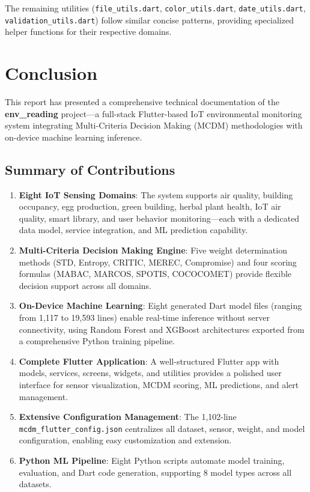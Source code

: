 \documentclass[12pt,a4paper,oneside]{report}
\begin{document}
The remaining utilities (\texttt{file\_utils.dart}, \texttt{color\_utils.dart}, \texttt{date\_utils.dart}, \texttt{validation\_utils.dart}) follow similar concise patterns, providing specialized helper functions for their respective domains.

\chapter{Conclusion}
\label{ch:conclusion}

This report has presented a comprehensive technical documentation of the \textbf{env\_reading} project---a full-stack Flutter-based IoT environmental monitoring system integrating Multi-Criteria Decision Making (MCDM) methodologies with on-device machine learning inference.

\section{Summary of Contributions}

\begin{enumerate}
  \item \textbf{Eight IoT Sensing Domains}: The system supports air quality, building occupancy, egg production, green building, herbal plant health, IoT air quality, smart library, and user behavior monitoring---each with a dedicated data model, service integration, and ML prediction capability.

  \item \textbf{Multi-Criteria Decision Making Engine}: Five weight determination methods (STD, Entropy, CRITIC, MEREC, Compromise) and four scoring formulas (MABAC, MARCOS, SPOTIS, COCOCOMET) provide flexible decision support across all domains.

  \item \textbf{On-Device Machine Learning}: Eight generated Dart model files (ranging from 1,117 to 19,593 lines) enable real-time inference without server connectivity, using Random Forest and XGBoost architectures exported from a comprehensive Python training pipeline.

  \item \textbf{Complete Flutter Application}: A well-structured Flutter app with models, services, screens, widgets, and utilities provides a polished user interface for sensor visualization, MCDM scoring, ML predictions, and alert management.

  \item \textbf{Extensive Configuration Management}: The 1,102-line \texttt{mcdm\_flutter\_config.json} centralizes all dataset, sensor, weight, and model configuration, enabling easy customization and extension.

  \item \textbf{Python ML Pipeline}: Eight Python scripts automate model training, evaluation, and Dart code generation, supporting 8 model types across all datasets.

\end{enumerate}
\end{document}
